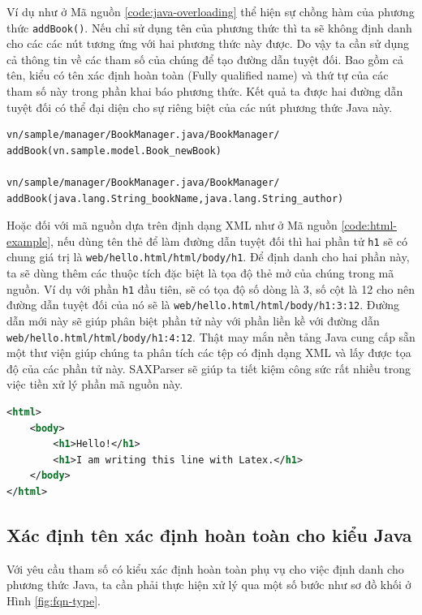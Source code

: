 \documentclass[12pt]{report}
\begin{document}
Ví dụ như ở Mã nguồn \ref{code:java-overloading} thể hiện sự chồng hàm của phương thức \texttt{addBook()}. Nếu chỉ sử dụng tên của phương thức thì ta sẽ không định danh cho các các nút tương ứng với hai phương thức này được. Do vậy ta cần sử dụng cả thông tin về các tham số của chúng để tạo đường dẫn tuyệt đối. Bao gồm cả tên, kiểu có tên xác định hoàn toàn (Fully qualified name) và thứ tự của các tham số này trong phần khai báo phương thức. Kết quả ta được hai đường dẫn tuyệt đối có thể đại diện cho sự riêng biệt của các nút phương thức Java này.

\begin{verbatim}
vn/sample/manager/BookManager.java/BookManager/
addBook(vn.sample.model.Book_newBook)

vn/sample/manager/BookManager.java/BookManager/
addBook(java.lang.String_bookName,java.lang.String_author)
\end{verbatim}

Hoặc đối với mã nguồn dựa trên định dạng XML như ở Mã nguồn \ref{code:html-example}, nếu dùng tên thẻ để làm đường dẫn tuyệt đối thì hai phần tử \texttt{h1} sẽ có chung giá trị là \texttt{web/hello.html/html/body/h1}. Để định danh cho hai phần này, ta sẽ dùng thêm các thuộc tích đặc biệt là tọa độ thẻ mở của chúng trong mã nguồn. Ví dụ với phần \texttt{h1} đầu tiên, sẽ có tọa độ số dòng là 3, số cột là 12 cho nên đường dẫn tuyệt đối của nó sẽ là \texttt{web/hello.html/html/body/h1:3:12}. Đường dẫn mới này sẽ giúp phân biệt phần tử này với phần liền kề với đường dẫn \texttt{web/hello.html/html/body/h1:4:12}. Thật may mắn nền tảng Java cung cấp sẵn một thư viện giúp chúng ta phân tích các tệp có định dạng XML và lấy được tọa độ của các phần tử này. SAXParser sẽ giúp ta tiết kiệm công sức rất nhiều trong việc tiền xử lý phần mã nguồn này.

\begin{lstlisting}[language=XML,
caption={Ví dụ mã nguồn HTML},label={code:html-example}]
<html>
	<body>
		<h1>Hello!</h1>
		<h1>I am writing this line with Latex.</h1>
	</body>
</html>
\end{lstlisting}

\subsection{Xác định tên xác định hoàn toàn cho kiểu Java}
Với yêu cầu tham số có kiểu xác định hoàn toàn phụ vụ cho việc định danh cho phương thức Java, ta cần phải thực hiện xử lý qua một số bước như sơ đồ khối ở Hình \ref{fig:fqn-type}.
\end{document}
